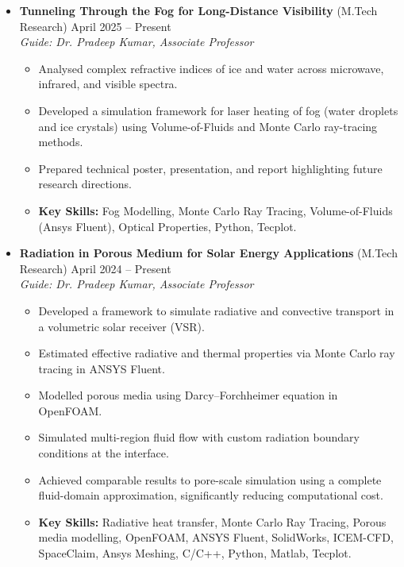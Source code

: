 \documentclass[letterpaper,10pt]{article}
\begin{document}
\begin{itemize}[leftmargin=*]

\item \textbf{Tunneling Through the Fog for Long-Distance Visibility} (M.Tech Research) 
  \hfill April 2025 -- Present \\
  \textit{Guide: Dr. Pradeep Kumar, Associate Professor}
  \begin{itemize}[noitemsep,topsep=0pt]
    \item Analysed complex refractive indices of ice and water across microwave, infrared, and visible spectra.
    \item Developed a simulation framework for laser heating of fog (water droplets and ice crystals) using Volume-of-Fluids and Monte Carlo ray-tracing methods.
    \item Prepared technical poster, presentation, and report highlighting future research directions.
    \item \textbf{Key Skills:} Fog Modelling, Monte Carlo Ray Tracing, Volume-of-Fluids (Ansys Fluent), Optical Properties, Python, Tecplot.
  \end{itemize}
    \vspace{0.5em}

\item \textbf{Radiation in Porous Medium for Solar Energy Applications} (M.Tech Research)
  \hfill April 2024 -- Present \\
  \textit{Guide: Dr. Pradeep Kumar, Associate Professor }
  \begin{itemize}[noitemsep,topsep=0pt]
    \item Developed a framework to simulate radiative and convective transport in a volumetric solar receiver (VSR).
    \item Estimated effective radiative and thermal properties via Monte Carlo ray tracing in ANSYS Fluent.
    \item Modelled porous media using Darcy–Forchheimer equation in OpenFOAM.
    \item Simulated multi-region fluid flow with custom radiation boundary conditions at the interface.
    \item Achieved comparable results to pore-scale simulation using a complete fluid-domain approximation, significantly reducing computational cost.
    \item \textbf{Key Skills:} Radiative heat transfer, Monte Carlo Ray Tracing, Porous media modelling, OpenFOAM, ANSYS Fluent, SolidWorks, ICEM-CFD, SpaceClaim, Ansys Meshing, C/C++, Python, Matlab, Tecplot.
  \end{itemize}
      \vspace{0.5em}


\end{itemize}
\end{document}
